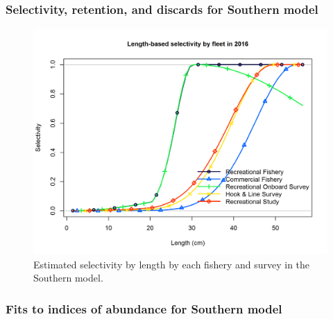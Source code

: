 \documentclass[12pt,]{article}
\begin{document}
\FloatBarrier

\newpage 

\subsubsection{Selectivity, retention, and discards for Southern
model}\label{selectivity-retention-and-discards-for-southern-model}

\begin{figure}[htbp]
\centering
\includegraphics{r4ss/plots_mod2/sel01_multiple_fleets_length1.png}
\caption{Estimated selectivity by length by each fishery and survey in
the Southern model. \label{fig:selex}}
\end{figure}

\FloatBarrier 

\newpage

\subsubsection{Fits to indices of abundance for Southern
model}\label{fits-to-indices-of-abundance-for-southern-model}
\end{document}
